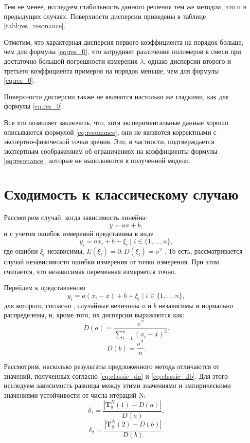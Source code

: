 \documentclass[12pt,a4paper]{article}
\theoremstyle{definition}
\begin{document}
Тем не менее, исследуем стабильность данного решения тем же методом, что и в
предыдущих случаях. Поверхности дисперсии приведены в таблице \ref{tabl:res_resonance}.

Отметим, что характерная дисперсия первого коэффициента на порядок больше, чем
для формулы \eqref{eq:res_0}, что затрудняет различение полимеров в смеси при
достаточно большой погрешности измерения $\lambda$, однако дисперсии второго и
третьего коэффициента примерно на порядок меньше, чем для формулы
\eqref{eq:res_0}.

Поверхности дисперсии также не являются настолько же гладкими, как для формулы
\eqref{eq:res_0}.

Все это позволяет заключить, что, хотя экспериментальные данные хорошо
описываются формулой \eqref{eq:resonance}, они не являются корректными с
экспертно-физической точки зрения. Это, в частности, подтверждается экспертным
соображением об ограничениях на коэффициенты формулы \eqref{eq:resonance},
которые не выполняются в полученной модели.

\section{Сходимость к классическому случаю}

Рассмотрим случай, когда зависимость линейна:
\[
  y = ax + b,
\]
и с учетом ошибок измерений представима в виде
\[
  y_i = ax_i + b + \xi_i \mid i \in \{ 1, \dots, n \},
\]
где ошибки $\xi_i$ независимы, $E(\xi_i) = 0; D(\xi_i) = \sigma^2$ \cite{Vatunin05}.
То есть, рассматривается случай независимости ошибки измерения от точки измерения.
При этом считается, что независимая переменная измеряется точно.

Перейдем к представлению
\[
  y_i = a(x_i - \overline{x}) + b + \xi_i \mid i \in \{ 1, \dots, n \},
\]
для которого, согласно \cite{Vatunin05}, случайные величины $a$ и $b$ независимы
и нормально распределены, и, кроме того, их дисперсии выражаются как:
\begin{equation}
  \label{eq:classic_da}
  D(a) = \frac{\sigma^2}{\sum_{i = 1}^n (x_i - \overline{x})^2}.
\end{equation}
\begin{equation}
  \label{eq:classic_db}
  D(b) = \frac{\sigma^2}{n}.
\end{equation}

Рассмотрим, насколько результаты предложенного метода отличаются от значений,
полученных согласно \eqref{eq:classic_da} и \eqref{eq:classic_db}. Для этого исследуем
зависимость разницы между этими значениями и эмпирическими значениями устойчивости от
числа итераций N:
\[
  \delta_1 = \frac{| \mathbf{T}^N_y(1) - D(a) |}{D(a)},
\]
\[
  \delta_2 = \frac{| \mathbf{T}^N_y(2) - D(b) |}{D(b)}.
\]
\end{document}
